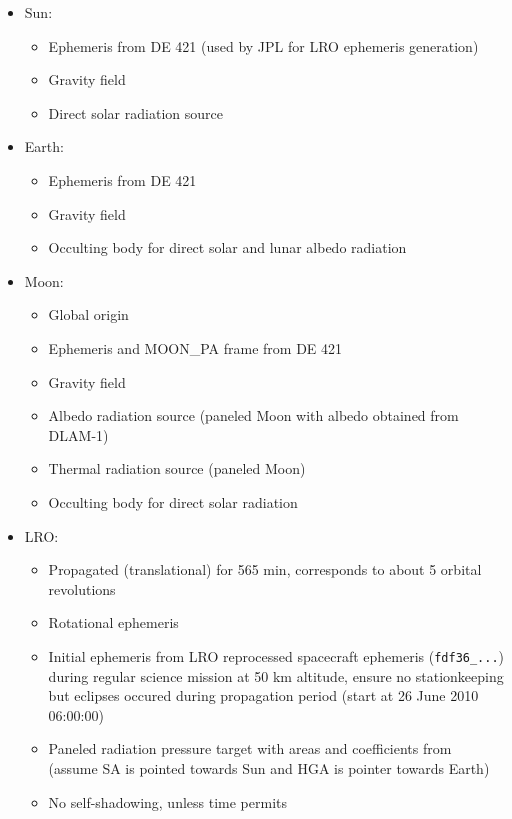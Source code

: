 \documentclass[parskip=full,DIV=15]{scrartcl}
\begin{document}
\begin{itemize}
   \item Sun:
   \begin{itemize}
      \item Ephemeris from DE 421 (used by JPL for LRO ephemeris generation)
      \item Gravity field
      \item Direct solar radiation source
   \end{itemize}
   \item Earth:
   \begin{itemize}
      \item Ephemeris from DE 421
      \item Gravity field
      \item Occulting body for direct solar and lunar albedo radiation
   \end{itemize}
   \item Moon:
   \begin{itemize}
      \item Global origin
      \item Ephemeris and MOON\_PA frame from DE 421
      \item Gravity field
      \item Albedo radiation source (paneled Moon with albedo obtained from DLAM-1)
      \item Thermal radiation source (paneled Moon)
      \item Occulting body for direct solar radiation
   \end{itemize}
   \item LRO:
   \begin{itemize}
      \item Propagated (translational) for 565 min, corresponds to about 5 orbital revolutions
      \item Rotational ephemeris
      \item Initial ephemeris from LRO reprocessed spacecraft ephemeris (\texttt{fdf36\_...}) during regular science mission at 50 km altitude, ensure no stationkeeping but eclipses occured during propagation period (start at 26 June 2010 06:00:00)
      \item Paneled radiation pressure target with areas and coefficients from \textcite{Smith2008} (assume SA is pointed towards Sun and HGA is pointer towards Earth)
      \item No self-shadowing, unless time permits
   \end{itemize}
\end{itemize}
\end{document}
